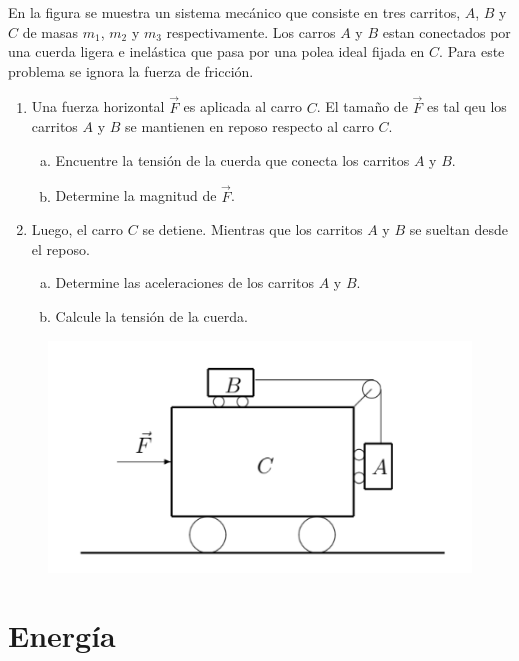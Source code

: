 \begin{ejercicio}
		En la figura se muestra un sistema mecánico que consiste en tres carritos, $A$, $B$ y $C$ de masas $m_1$, $m_2$ y $m_3$ respectivamente. Los carros $A$ y $B$ estan conectados por una cuerda ligera e inelástica que pasa por una polea ideal fijada en $C$. Para este problema se ignora la fuerza de fricción.
	\begin{enumerate}
		\item Una fuerza horizontal $\vec{F}$ es aplicada al carro $C$. El tamaño de $\vec{F}$ es tal qeu los carritos $A$ y $B$ se mantienen en reposo respecto al carro $C$.
		\begin{enumerate}[a)]
			\item Encuentre la tensión de la cuerda que conecta los carritos $A$ y $B$.
			\item Determine la magnitud de $\vec{F}$.
		\end{enumerate}
		\item Luego, el carro $C$ se detiene. Mientras que los carritos $A$ y $B$ se sueltan desde el reposo.
		\begin{enumerate}[a)]
			\item Determine las aceleraciones de los carritos $A$ y $B$.
			\item Calcule la tensión de la cuerda.
		\end{enumerate}
	\end{enumerate}
		\begin{figure}[H]
			\centering
			\includegraphics[scale=0.4]{./img/carrito.png}
		\end{figure}
	\end{ejercicio}






\section*{Energía}



